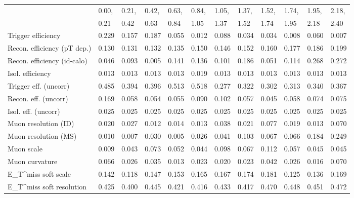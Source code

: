 \begin{tabular}{l|p{0.6cm}p{0.6cm}p{0.6cm}p{0.6cm}p{0.6cm}p{0.6cm}p{0.6cm}p{0.6cm}p{0.6cm}p{0.6cm}p{0.6cm}}
\hline
   & 0.00, & 0.21, & 0.42, & 0.63, & 0.84, & 1.05, & 1.37, & 1.52, & 1.74, & 1.95, & 2.18,  \\ 
   & 0.21 & 0.42 & 0.63 & 0.84 & 1.05 & 1.37 & 1.52 & 1.74 & 1.95 & 2.18 & 2.40  \\ 
\hline
Trigger efficiency                       & 0.229 & 0.157 & 0.187 & 0.055 & 0.012 & 0.088 & 0.034 & 0.034 & 0.008 & 0.060 & 0.007 \\
Recon. efficiency (pT dep.)              & 0.130 & 0.131 & 0.132 & 0.135 & 0.150 & 0.146 & 0.152 & 0.160 & 0.177 & 0.186 & 0.199 \\
Recon. efficiency (id-calo)              & 0.046 & 0.093 & 0.005 & 0.141 & 0.136 & 0.101 & 0.186 & 0.051 & 0.114 & 0.268 & 0.272 \\
Isol. efficiency                         & 0.013 & 0.013 & 0.013 & 0.013 & 0.019 & 0.013 & 0.013 & 0.013 & 0.013 & 0.013 & 0.013 \\
Trigger eff. (uncorr)                    & 0.485 & 0.394 & 0.396 & 0.513 & 0.518 & 0.277 & 0.322 & 0.302 & 0.313 & 0.340 & 0.367 \\
Recon. eff. (uncorr)                     & 0.169 & 0.058 & 0.054 & 0.055 & 0.090 & 0.102 & 0.057 & 0.045 & 0.058 & 0.074 & 0.075 \\
Isol. eff. (uncorr)                      & 0.025 & 0.025 & 0.025 & 0.025 & 0.025 & 0.025 & 0.025 & 0.025 & 0.025 & 0.025 & 0.025 \\
Muon resolution (ID)                     & 0.020 & 0.027 & 0.012 & 0.014 & 0.013 & 0.038 & 0.021 & 0.077 & 0.019 & 0.013 & 0.070 \\
Muon resolution (MS)                     & 0.010 & 0.007 & 0.030 & 0.005 & 0.026 & 0.041 & 0.103 & 0.067 & 0.066 & 0.184 & 0.249 \\
Muon scale                               & 0.009 & 0.043 & 0.073 & 0.052 & 0.044 & 0.098 & 0.067 & 0.112 & 0.057 & 0.045 & 0.045 \\
Muon curvature                           & 0.066 & 0.026 & 0.035 & 0.013 & 0.023 & 0.020 & 0.023 & 0.042 & 0.026 & 0.016 & 0.070 \\
E_{T}^{miss} soft scale                  & 0.142 & 0.118 & 0.147 & 0.153 & 0.165 & 0.167 & 0.174 & 0.181 & 0.125 & 0.136 & 0.169 \\
E_{T}^{miss} soft resolution             & 0.425 & 0.400 & 0.445 & 0.421 & 0.416 & 0.433 & 0.417 & 0.470 & 0.448 & 0.451 & 0.472 \\

\end{tabular}
